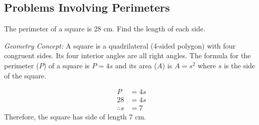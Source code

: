 \subsection*{Problems Involving Perimeters}
\begin{example}
\Item The perimeter of a square is 28 cm. Find the length of each side.

\Solution

\textit{Geometry Concept:} A square is a quadrilateral (4-sided polygon) with four congruent sides. Its four
interior angles are all right angles. The formula for the perimeter ($P$) of a square is $P = 4s$ and its area ($A$) is $A = s^2$ where $s$ is the side of the square.

\begin{align*}
P&=4s\\
28&=4s\\
\therefore s&=7
\end{align*}
Therefore, the square has side of length 7 cm.
\end{example}

